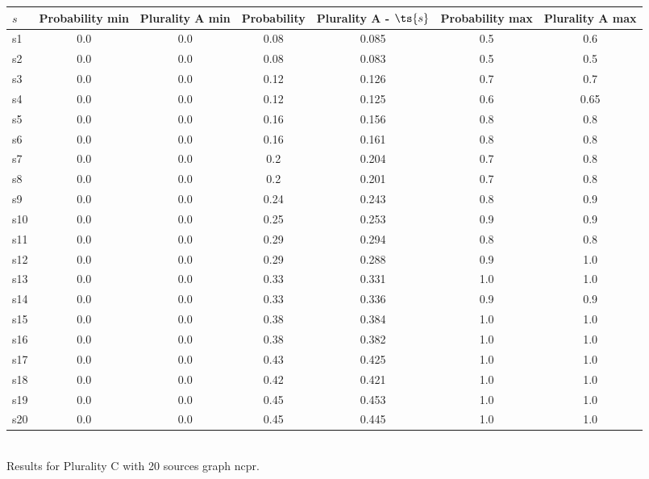 \documentclass{article}
\begin{document}
\noindent\begin{tabular}{|l|c|c|c|c|c|c|}
\hline
$s$& Probability min & Plurality A min & Probability & Plurality A - $\ts{s}$ & Probability max & Plurality A max\\
\hline
s1 &0.0 & 0.0 & 0.08 & 0.085 & 0.5 & 0.6\\
\hline
s2 &0.0 & 0.0 & 0.08 & 0.083 & 0.5 & 0.5\\
\hline
s3 &0.0 & 0.0 & 0.12 & 0.126 & 0.7 & 0.7\\
\hline
s4 &0.0 & 0.0 & 0.12 & 0.125 & 0.6 & 0.65\\
\hline
s5 &0.0 & 0.0 & 0.16 & 0.156 & 0.8 & 0.8\\
\hline
s6 &0.0 & 0.0 & 0.16 & 0.161 & 0.8 & 0.8\\
\hline
s7 &0.0 & 0.0 & 0.2 & 0.204 & 0.7 & 0.8\\
\hline
s8 &0.0 & 0.0 & 0.2 & 0.201 & 0.7 & 0.8\\
\hline
s9 &0.0 & 0.0 & 0.24 & 0.243 & 0.8 & 0.9\\
\hline
s10 &0.0 & 0.0 & 0.25 & 0.253 & 0.9 & 0.9\\
\hline
s11 &0.0 & 0.0 & 0.29 & 0.294 & 0.8 & 0.8\\
\hline
s12 &0.0 & 0.0 & 0.29 & 0.288 & 0.9 & 1.0\\
\hline
s13 &0.0 & 0.0 & 0.33 & 0.331 & 1.0 & 1.0\\
\hline
s14 &0.0 & 0.0 & 0.33 & 0.336 & 0.9 & 0.9\\
\hline
s15 &0.0 & 0.0 & 0.38 & 0.384 & 1.0 & 1.0\\
\hline
s16 &0.0 & 0.0 & 0.38 & 0.382 & 1.0 & 1.0\\
\hline
s17 &0.0 & 0.0 & 0.43 & 0.425 & 1.0 & 1.0\\
\hline
s18 &0.0 & 0.0 & 0.42 & 0.421 & 1.0 & 1.0\\
\hline
s19 &0.0 & 0.0 & 0.45 & 0.453 & 1.0 & 1.0\\
\hline
s20 &0.0 & 0.0 & 0.45 & 0.445 & 1.0 & 1.0\\
\hline
\end{tabular}\\

\noindent Results for Plurality C with 20 sources graph ncpr.
\end{document}
